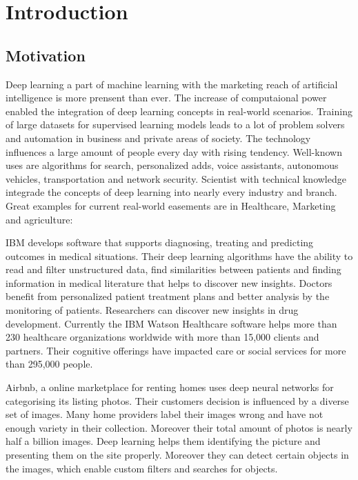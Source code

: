 \chapter{Introduction}

\section{Motivation}

Deep learning a part of machine learning with the marketing reach of artificial intelligence is more prensent than ever.
The increase of computaional power enabled the integration of deep learning concepts in real-world scenarios.
Training of large datasets for supervised learning models leads to a lot of problem solvers and automation in business and private areas of society.
The technology influences a large amount of people every day with rising tendency.
Well-known uses are algorithms for search, personalized adds, voice assistants, autonomous vehicles, transportation and network security.
\hfill \break
Scientist with technical knowledge integrade the concepts of deep learning into nearly every industry and branch.
Great examples for current real-world easements are in Healthcare, Marketing and agriculture:

IBM develops software that supports diagnosing, treating and predicting outcomes in medical situations.
Their deep learning algorithms have the ability to read and filter unstructured data, find similarities between patients and finding information in medical literature that helps to discover new insights.
Doctors benefit from personalized patient treatment plans and better analysis by the monitoring of patients. Researchers can discover new insights in drug development.
Currently the IBM Watson Healthcare software helps more than 230 healthcare organizations worldwide with more than 15,000 clients and partners. Their cognitive offerings have impacted care or social services for more than 295,000 people.
\cite{ibm-watson-healthcare, ibm-watson-facts}

Airbnb, a online marketplace for renting homes uses deep neural networks for categorising its listing photos.
Their customers decision is influenced by a diverse set of images.
Many home providers label their images wrong and have not enough variety in their collection.
Moreover their total amount of photos is nearly half a billion images.
Deep learning helps them identifying the picture and presenting them on the site properly.
Moreover they can detect certain objects in the images, which enable custom filters and searches for objects.
\cite{airbnb-ic-video, airbnb-ic-blog}

